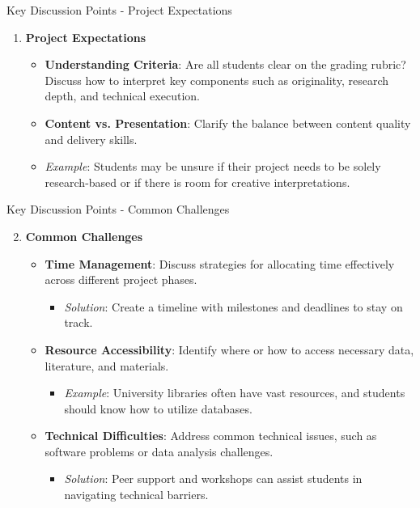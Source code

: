 \documentclass[aspectratio=169]{beamer}
\begin{document}
\begin{frame}[fragile]{Key Discussion Points - Project Expectations}
    \begin{enumerate}
        \item \textbf{Project Expectations}
        \begin{itemize}
            \item \textbf{Understanding Criteria}: Are all students clear on the grading rubric? Discuss how to interpret key components such as originality, research depth, and technical execution.
            \item \textbf{Content vs. Presentation}: Clarify the balance between content quality and delivery skills.
            \item \textit{Example}: Students may be unsure if their project needs to be solely research-based or if there is room for creative interpretations.
        \end{itemize}
    \end{enumerate}
\end{frame}

\begin{frame}[fragile]{Key Discussion Points - Common Challenges}
    \begin{enumerate}
        \setcounter{enumi}{1}
        \item \textbf{Common Challenges}
        \begin{itemize}
            \item \textbf{Time Management}: Discuss strategies for allocating time effectively across different project phases.
            \begin{itemize}
                \item \textit{Solution}: Create a timeline with milestones and deadlines to stay on track.
            \end{itemize}
            \item \textbf{Resource Accessibility}: Identify where or how to access necessary data, literature, and materials.
            \begin{itemize}
                \item \textit{Example}: University libraries often have vast resources, and students should know how to utilize databases.
            \end{itemize}
            \item \textbf{Technical Difficulties}: Address common technical issues, such as software problems or data analysis challenges.
            \begin{itemize}
                \item \textit{Solution}: Peer support and workshops can assist students in navigating technical barriers.
            \end{itemize}
        \end{itemize}
    \end{enumerate}
\end{frame}
\end{document}
